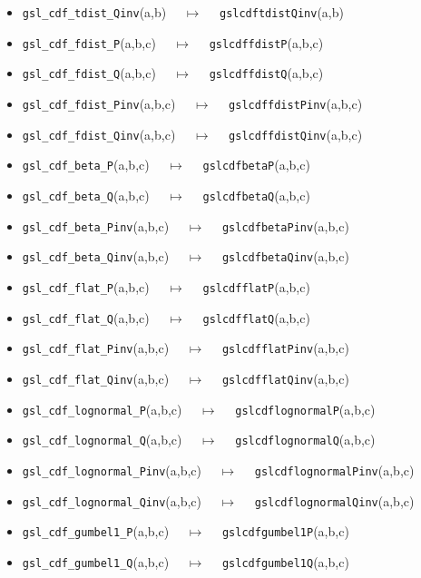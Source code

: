 \documentclass[a4paper,twoside,12pt]{book}
\begin{document}
{\begin{itemize}
\item \texttt{gsl\_cdf\_tdist\_Qinv}(a,b) $\quad \mapsto\quad $ \texttt{gslcdftdistQinv}(a,b) 
\item \texttt{gsl\_cdf\_fdist\_P}(a,b,c) $\quad \mapsto\quad $ \texttt{gslcdffdistP}(a,b,c) 
\item \texttt{gsl\_cdf\_fdist\_Q}(a,b,c) $\quad \mapsto\quad $ \texttt{gslcdffdistQ}(a,b,c) 
\item \texttt{gsl\_cdf\_fdist\_Pinv}(a,b,c) $\quad \mapsto\quad $ \texttt{gslcdffdistPinv}(a,b,c) 
\item \texttt{gsl\_cdf\_fdist\_Qinv}(a,b,c) $\quad \mapsto\quad $ \texttt{gslcdffdistQinv}(a,b,c) 
\item \texttt{gsl\_cdf\_beta\_P}(a,b,c) $\quad \mapsto\quad $ \texttt{gslcdfbetaP}(a,b,c) 
\item \texttt{gsl\_cdf\_beta\_Q}(a,b,c) $\quad \mapsto\quad $ \texttt{gslcdfbetaQ}(a,b,c) 
\item \texttt{gsl\_cdf\_beta\_Pinv}(a,b,c) $\quad \mapsto\quad $ \texttt{gslcdfbetaPinv}(a,b,c) 
\item \texttt{gsl\_cdf\_beta\_Qinv}(a,b,c) $\quad \mapsto\quad $ \texttt{gslcdfbetaQinv}(a,b,c) 
\item \texttt{gsl\_cdf\_flat\_P}(a,b,c) $\quad \mapsto\quad $ \texttt{gslcdfflatP}(a,b,c) 
\item \texttt{gsl\_cdf\_flat\_Q}(a,b,c) $\quad \mapsto\quad $ \texttt{gslcdfflatQ}(a,b,c) 
\item \texttt{gsl\_cdf\_flat\_Pinv}(a,b,c) $\quad \mapsto\quad $ \texttt{gslcdfflatPinv}(a,b,c) 
\item \texttt{gsl\_cdf\_flat\_Qinv}(a,b,c) $\quad \mapsto\quad $ \texttt{gslcdfflatQinv}(a,b,c) 
\item \texttt{gsl\_cdf\_lognormal\_P}(a,b,c) $\quad \mapsto\quad $ \texttt{gslcdflognormalP}(a,b,c) 
\item \texttt{gsl\_cdf\_lognormal\_Q}(a,b,c) $\quad \mapsto\quad $ \texttt{gslcdflognormalQ}(a,b,c) 
\item \texttt{gsl\_cdf\_lognormal\_Pinv}(a,b,c) $\quad \mapsto\quad $ \texttt{gslcdflognormalPinv}(a,b,c) 
\item \texttt{gsl\_cdf\_lognormal\_Qinv}(a,b,c) $\quad \mapsto\quad $ \texttt{gslcdflognormalQinv}(a,b,c) 
\item \texttt{gsl\_cdf\_gumbel1\_P}(a,b,c) $\quad \mapsto\quad $ \texttt{gslcdfgumbel1P}(a,b,c) 
\item \texttt{gsl\_cdf\_gumbel1\_Q}(a,b,c) $\quad \mapsto\quad $ \texttt{gslcdfgumbel1Q}(a,b,c) 

\end{itemize}}
\end{document}
